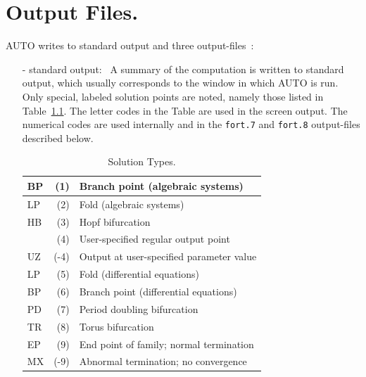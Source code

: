 \documentclass[12pt]{report}
\begin{document}
\chapter{ Output Files.} \label{ch:Output_files}
{\cal AUTO} writes to standard output and three output-files~:
\begin{itemize}
\item[-] standard output:~
  A summary of the computation is written to standard output, which usually
  corresponds to the window in which {\cal AUTO} is run. 
  Only special, labeled solution points are noted, namely those listed
  in Table~\ref{tbl:Solution_Types}.
  The letter codes in the Table are used in the screen output.
  The numerical codes are used internally and in
  the {\tt fort.7} and {\tt fort.8} output-files described below.

\begin{table}[htbp]
\begin{center}
\begin{tabular}{| l | r | l |}
\hline
 BP & (1)  & Branch point (algebraic systems) \\
\hline
 LP & (2)  & Fold (algebraic systems) \\
\hline
 HB & (3)  & Hopf bifurcation \\
\hline
  & (4)  & User-specified regular output point \\
\hline
 UZ & (-4)  & Output at user-specified parameter value \\
\hline
 LP & (5)  & Fold (differential equations) \\
\hline
 BP & (6)  & Branch point (differential equations) \\
\hline
 PD & (7)  & Period doubling bifurcation \\
\hline
 TR & (8)  & Torus bifurcation \\
\hline
 EP & (9)  & End point of family; normal termination \\
\hline
 MX & (-9)  & Abnormal termination; no convergence \\
\hline
\end{tabular}
\caption{Solution Types.}
\label{tbl:Solution_Types}
\end{center}
\end{table}
 


\end{itemize}
\end{document}
